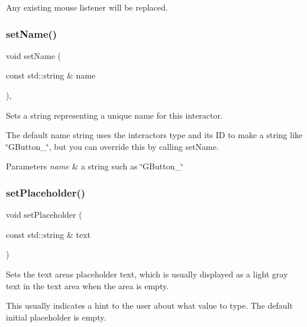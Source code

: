 Any existing mouse listener will be replaced. \mbox{\label{classGInteractor_a9d3a2685df23b5e7cbf59c19c4a1f9b5}} 
\subsubsection{\texorpdfstring{set\+Name()}{setName()}}
{\footnotesize\ttfamily void set\+Name (\begin{DoxyParamCaption}\item[{const std\+::string \&}]{name }\end{DoxyParamCaption})\hspace{0.3cm}{\ttfamily [virtual]}, {\ttfamily [inherited]}}



Sets a string representing a unique name for this interactor. 

The default name string uses the interactor\textquotesingle{}s type and its ID to make a string like \char`\"{}\+G\+Button\+\_\char`\"{}, but you can override this by calling set\+Name. 
\begin{DoxyParams}{Parameters}
{\em name} & a string such as \char`\"{}\+G\+Button\+\_\char`\"{} \\
\hline
\end{DoxyParams}
\mbox{\label{classGTextArea_aa21a9bebb4652ab6780d0c11eff47aee}} 
\subsubsection{\texorpdfstring{set\+Placeholder()}{setPlaceholder()}}
{\footnotesize\ttfamily void set\+Placeholder (\begin{DoxyParamCaption}\item[{const std\+::string \&}]{text }\end{DoxyParamCaption})\hspace{0.3cm}{\ttfamily [virtual]}}



Sets the text area\textquotesingle{}s placeholder text, which is usually displayed as a light gray text in the text area when the area is empty. 

This usually indicates a hint to the user about what value to type. The default initial placeholder is empty. \mbox{\label{classGInteractor_a1ab987704fce32098706c6f00fb08218}} 
